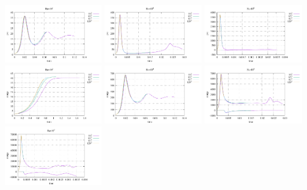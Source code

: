 \begin{center}
\includegraphics[width=4.297cm]{python_codes/fieldstone_155/results/stats_psi_Ra1e4}
\includegraphics[width=4.297cm]{python_codes/fieldstone_155/results/stats_psi_Ra1e5}
\includegraphics[width=4.297cm]{python_codes/fieldstone_155/results/stats_psi_Ra1e6}\\
\includegraphics[width=4.297cm]{python_codes/fieldstone_155/results/stats_omega_Ra1e3}
\includegraphics[width=4.297cm]{python_codes/fieldstone_155/results/stats_omega_Ra1e4}
\includegraphics[width=4.297cm]{python_codes/fieldstone_155/results/stats_omega_Ra1e5}
\includegraphics[width=4.297cm]{python_codes/fieldstone_155/results/stats_omega_Ra1e6}

\end{center}

